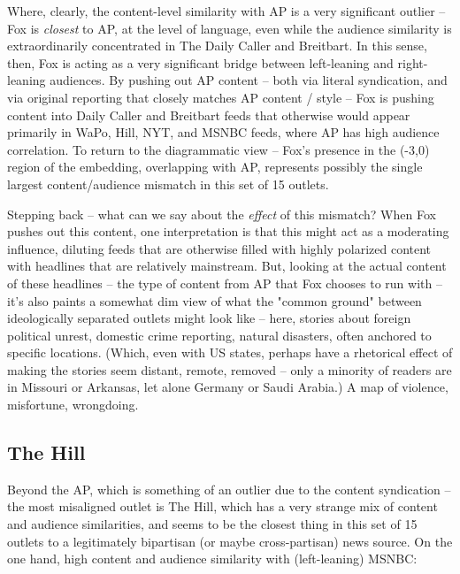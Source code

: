 \documentclass{scrartcl}
\begin{document}
Where, clearly, the content-level similarity with AP is a very significant outlier -- Fox is \textit{closest} to AP, at the level of language, even while the audience similarity is extraordinarily concentrated in The Daily Caller and Breitbart. In this sense, then, Fox is acting as a very significant bridge between left-leaning and right-leaning audiences. By pushing out AP content -- both via literal syndication, and via original reporting that closely matches AP content / style -- Fox is pushing content into Daily Caller and Breitbart feeds that otherwise would appear primarily in WaPo, Hill, NYT, and MSNBC feeds, where AP has high audience correlation. To return to the diagrammatic view -- Fox's presence in the (-3,0) region of the embedding, overlapping with AP, represents possibly the single largest content/audience mismatch in this set of 15 outlets.

Stepping back -- what can we say about the \textit{effect} of this mismatch? When Fox pushes out this content, one interpretation is that this might act as a moderating influence, diluting feeds that are otherwise filled with highly polarized content with headlines that are relatively mainstream. But, looking at the actual content of these headlines -- the type of content from AP that Fox chooses to run with -- it's also paints a somewhat dim view of what the "common ground" between ideologically separated outlets might look like -- here, stories about foreign political unrest, domestic crime reporting, natural disasters, often anchored to specific locations. (Which, even with US states, perhaps have a rhetorical effect of making the stories seem distant, remote, removed -- only a minority of readers are in Missouri or Arkansas, let alone Germany or Saudi Arabia.) A map of violence, misfortune, wrongdoing.

\subsection{The Hill}

Beyond the AP, which is something of an outlier due to the content syndication -- the most misaligned outlet is The Hill, which has a very strange mix of content and audience similarities, and seems to be the closest thing in this set of 15 outlets to a legitimately bipartisan (or maybe cross-partisan) news source. On the one hand, high content and audience similarity with (left-leaning) MSNBC:
\end{document}
